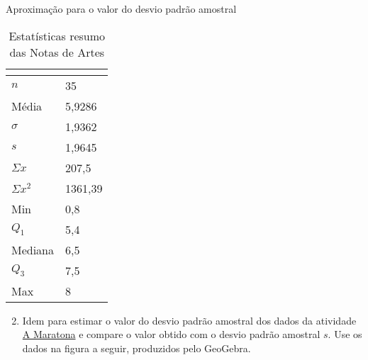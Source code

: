 {{{\begin{task}{Aproximação para o valor do desvio padrão amostral}
\begin{table}[H]
\centering
\begin{tabular}{|l|l|}
\hline
\multicolumn{2}{|c|}{\cellcolor{\currentcolor!80}{\textcolor{white}{\textbf{Estatística}}}}\\
\hline
$n$ & 35 \\
\hline
Média & 5,9286 \\
\hline
$\sigma$ & 1,9362 \\
\hline
$s$ & 1,9645 \\
\hline
$\Sigma x$ & 207,5 \\
\hline
$\Sigma x^2$ & 1361,39 \\
\hline
Min & 0,8 \\
\hline
$Q_1$ & 5,4 \\
\hline
Mediana & 6,5 \\
\hline
$Q_3$ & 7,5 \\
\hline
Max & 8 \\
\hline
\end{tabular}
\caption{Estatísticas resumo das Notas de Artes}\label{\detokenize{PE104-5:fig-resumonartes}}\label{\detokenize{PE104-5:id2}}
\end{table}

\begin{enumerate}
\setcounter{enumi}{1}
\item {} 
Idem para estimar o valor do desvio padrão amostral dos dados da atividade \hyperref[\detokenize{PE104-0:ativ-maratona-de-ny}]{A Maratona} e compare o valor obtido com o desvio padrão amostral \(s\). Use os dados na figura a seguir, produzidos pelo GeoGebra.

\end{enumerate}


\end{task}}}}
